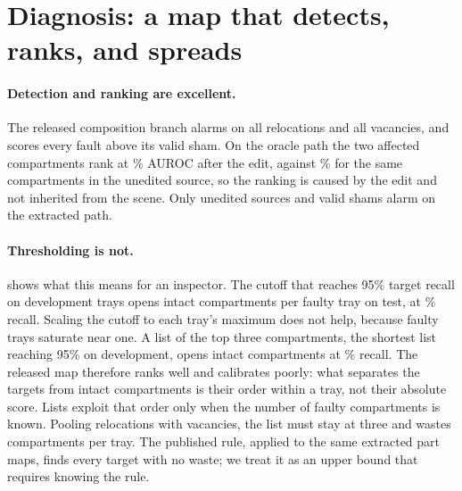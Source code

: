 \section{Diagnosis: a map that detects, ranks, and spreads}
\label{sec:diagnosis}
\begin{table}[t]
\centering
\caption{\textbf{What the released SALAD map gives an inspector.} Extracted path, 138 test trays. $R$: target recall. $W$: intact compartments queued per faulty tray (13 per relocation, 14 per vacancy). Pooled trays mix relocations (two targets) and vacancies (one), with every parameter refit on pooled development trays. Clean trays: compartments queued per unedited source and per valid sham. The rule uses the published constraint and is extra task knowledge.}
\label{tab:released}
\footnotesize\setlength{\tabcolsep}{2.4pt}

\end{table}

\paragraph{Detection and ranking are excellent.}
The released composition branch alarms on all \relFaults{} relocations and all \relVacancies{} vacancies, and scores every fault above its valid sham. On the oracle path the two affected compartments rank at \relAUC\% AUROC after the edit, against \relAUCsrc\% for the same compartments in the unedited source, so the ranking is caused by the edit and not inherited from the scene. Only \relSrcAlerts{} unedited sources and \relShamAlerts{} valid shams alarm on the extracted path.

\paragraph{Thresholding is not.}
 shows what this means for an inspector. The cutoff that reaches 95\% target recall on development trays opens \relThrW{} intact compartments per faulty tray on test, at \relThrR\% recall. Scaling the cutoff to each tray's maximum does not help, because faulty trays saturate near one. A list of the top three compartments, the shortest list reaching 95\% on development, opens \relListW{} intact compartments at \relListR\% recall. The released map therefore ranks well and calibrates poorly: what separates the targets from intact compartments is their order within a tray, not their absolute score. Lists exploit that order only when the number of faulty compartments is known. Pooling relocations with vacancies, the list must stay at three and wastes \relPoolListW{} compartments per tray. The published rule, applied to the same extracted part maps, finds every target with no waste; we treat it as an upper bound that requires knowing the rule.

